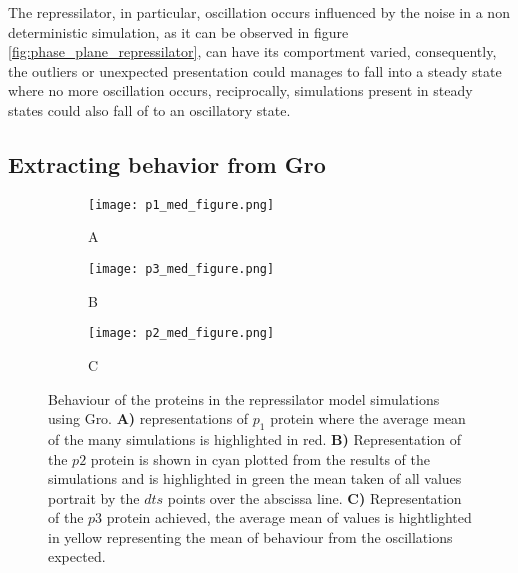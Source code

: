 \documentclass[12pt]{article}
\begin{document}
The repressilator, in particular, oscillation occurs influenced by the noise in a non deterministic simulation, as it can be observed in figure \ref{fig:phase_plane_repressilator}, can have its comportment varied, consequently, the outliers or unexpected presentation could manages to fall into a steady state where no more oscillation occurs, reciprocally, simulations present in steady states could also fall of to an oscillatory state. 


\subsection{Extracting behavior from Gro}

\begin{center}
    \begin{figure}[h]
        
        \begin{subfigure}[h]{.3\textwidth}
            \texttt{[image: p1\_med\_figure.png]}
            \caption{A}
        \end{subfigure} %
        \begin{subfigure}[h]{.3\textwidth}
            \texttt{[image: p3\_med\_figure.png]}
            \caption{B}
        \end{subfigure} %
        \begin{subfigure}[h]{.3\textwidth}
            \texttt{[image: p2\_med\_figure.png]}
            \caption{C}
        \end{subfigure}
        
        \caption{
        Behaviour of the proteins in the repressilator model simulations using Gro. \textbf{A)} representations of $p_{1}$ protein where the average mean of the many simulations is highlighted in red. \textbf{B)} Representation of the $p2$ protein is shown in cyan plotted from the results of the simulations and is highlighted in green the mean taken of all values portrait by the $dts$ points over the abscissa line. \textbf{C)} Representation of the $p3$ protein achieved, the average mean of values is hightlighted in yellow representing the mean of behaviour from the oscillations expected.}
    \end{figure}
\end{center}
\end{document}
